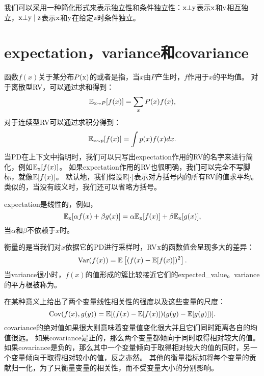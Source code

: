 我们可以采用一种简化形式来表示独立性和条件独立性：$\mathrm{x} \bot \mathrm{y}$表示$\mathrm{x}$和$\mathrm{y}$相互独立，$\mathrm{x} \bot \mathrm{y} \mid \mathrm{z}$表示$\mathrm{x}$和$\mathrm{y}$在给定$\mathrm{z}$时条件独立。

\section{\gls{expectation}，\gls{variance}和\gls{covariance}}
\label{sec:expectation_variance_and_covariance}

函数$f(x)$关于某分布$P(\mathrm{x})$的或者是指，当$x$由$P$产生时，$f$作用于$x$的平均值。
对于离散型\gls{RV}，可以通过求和得到：
\begin{equation}
\mathbb{E}_{\mathrm{x} \sim P}[f(x)] = \sum_x P(x)f(x),
\end{equation}
对于连续型\gls{RV}可以通过求积分得到：
\begin{equation}
\mathbb{E}_{\mathrm{x} \sim p}[f(x)] = \int p(x)f(x)dx.
\end{equation}
当\gls{PD}在上下文中指明时，我们可以只写出\gls{expectation}作用的\gls{RV}的名字来进行简化，例如$\mathbb{E}_{\mathrm{x}}[f(x)]$。
如果\gls{expectation}作用的\gls{RV}也很明确，我们可以完全不写脚标，就像$\mathbb{E}[f(x)]$。
默认地，我们假设$\mathbb{E}[\cdot]$表示对方括号内的所有\gls{RV}的值求平均。
类似的，当没有歧义时，我们还可以省略方括号。


\gls{expectation}是线性的，例如，
\begin{equation}
\mathbb{E}_{\mathrm{x}}[\alpha f(x) + \beta g(x)] = \alpha \mathbb{E}_{\mathrm{x}}[f(x)] + \beta \mathbb{E}_{\mathrm{x}}[g(x)],
\end{equation}
当$\alpha$和$\beta$不依赖于$x$时。

衡量的是当我们对$x$依据它的\gls{PD}进行采样时，\gls{RV}$\mathrm{x}$的函数值会呈现多大的差异：
\begin{equation}
\text{Var}(f(x)) = \mathbb{E} \left [(f(x) - \mathbb{E}[f(x)])^2 \right].
\end{equation}
当\gls{variance}很小时，$f(x)$的值形成的簇比较接近它们的\gls{expected_value}。\gls{variance}的平方根被称为。

在某种意义上给出了两个变量线性相关性的强度以及这些变量的尺度：
\begin{equation}
\text{Cov}(f(x), g(y)) = \mathbb{E}[ ( f(x)-\mathbb{E}[f(x)] )( g(y)-\mathbb{E}[g(y)] ) ].
\end{equation}
\gls{covariance}的绝对值如果很大则意味着变量值变化很大并且它们同时距离各自的均值很远。
如果\gls{covariance}是正的，那么两个变量都倾向于同时取得相对较大的值。
如果\gls{covariance}是负的，那么其中一个变量倾向于取得相对较大的值的同时，另一个变量倾向于取得相对较小的值，反之亦然。
其他的衡量指标如将每个变量的贡献归一化，为了只衡量变量的相关性，而不受变量大小的分别影响。

